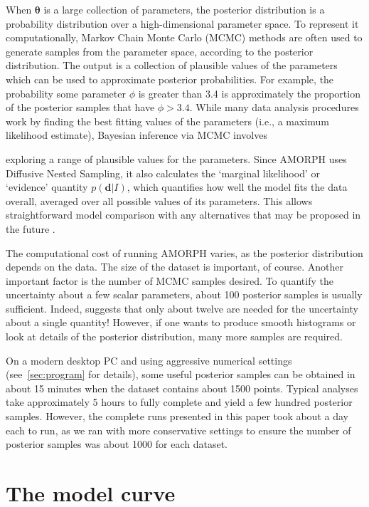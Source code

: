 \documentclass[review]{elsarticle}
\newcommand{\params}{\boldsymbol{\theta}}
\newcommand{\data}{\boldsymbol{d}}
\newcommand{\info}{I}
\newcommand{\changed}{\color{blue}}
\begin{document}
When $\params$ is a large collection of parameters, the posterior distribution
is a probability distribution over a high-dimensional parameter space. To
represent it computationally, Markov Chain Monte Carlo (MCMC) methods are
often used to generate samples from the parameter space, according to the
posterior distribution. The output is a collection of plausible values of the
parameters which can be used to approximate posterior probabilities.
For example, the probability some parameter $\phi$ is greater than 3.4
is approximately the proportion of the posterior samples that have
$\phi > 3.4$. While many data analysis procedures work by finding the
best fitting values of the parameters (i.e., a maximum likelihood estimate),
Bayesian inference via MCMC involves {\changed exploring a range of plausible values
for the parameters. Since AMORPH uses Diffusive Nested Sampling, it also calculates
the `marginal likelihood' or `evidence' quantity $p(\data | \info)$, which
quantifies how well the model fits the data overall, averaged over all
possible values of its parameters. This allows straightforward model comparison
with any alternatives that may be proposed in the future
\citep{skilling2006nested}.

The computational cost of running AMORPH
varies, as the posterior distribution depends on the data.
The size of the dataset is important, of course.
Another important factor is the number of MCMC samples desired.
To quantify the uncertainty about a few scalar parameters, about
100 posterior samples is usually sufficient. Indeed, \citet[][p. 380]{mackay2003} suggests
that only about twelve are needed for the uncertainty about a single
quantity!
However, if one wants to produce
smooth histograms or look at details of the posterior distribution,
many more samples are required.

On a modern desktop PC and using aggressive numerical settings
(see~\ref{sec:program} for details),
some useful posterior samples can be obtained in about
15 minutes when the dataset contains about 1500 points.
Typical analyses take approximately 5 hours to fully complete and yield
a few hundred posterior samples.
However, the complete runs presented in this paper took
about a day each to run, as we ran with more conservative settings
to ensure the number of posterior samples was about 1000 for each dataset.}

\section{The model curve}\label{sec:model}
\end{document}
